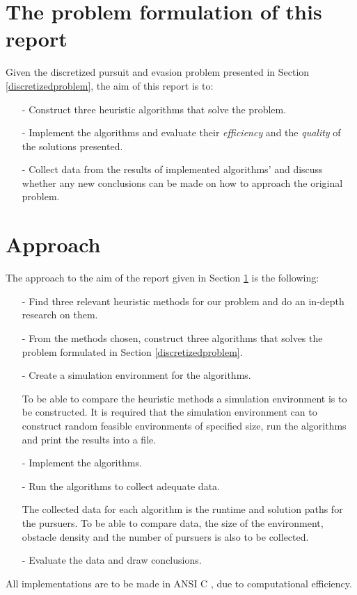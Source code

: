 \section{The problem formulation of this report}\label{ourproblemformulation}
Given the discretized pursuit and evasion problem presented in Section \ref{discretizedproblem}, the aim of this report is to:
\begin{enumerate}
\item[-] Construct three heuristic algorithms that solve the problem.
\item[-] Implement the algorithms and evaluate their \emph{efficiency} and the \emph{quality} of the solutions presented.
\item[-] Collect data from the results of implemented algorithms' and discuss whether any new conclusions can be made on how to approach the original problem.
\end{enumerate}
\section{Approach}
The approach to the aim of the report given in Section \ref{ourproblemformulation} is the following:
\begin{enumerate}
\item[-] Find three relevant heuristic methods for our problem and do an in-depth research on them.
\item[-] From the methods chosen, construct three algorithms that solves the problem formulated in Section \ref{discretizedproblem}.
\item[-] Create a simulation environment for the algorithms.
\par{To be able to compare the heuristic methods a simulation environment is to be constructed. It is required that the simulation environment can to construct random feasible environments of specified size, run the algorithms and print the results into a file.}
\item[-] Implement the algorithms.
\item[-] Run the algorithms to collect adequate data.
\par{The collected data for each algorithm is the runtime and solution paths for the pursuers. To be able to compare data, the size of the environment, obstacle density and the number of pursuers is also to be collected.}
\item[-] Evaluate the data and draw conclusions.
\end{enumerate}
All implementations are to be made in ANSI C \cite{C-bok}, due to computational efficiency.